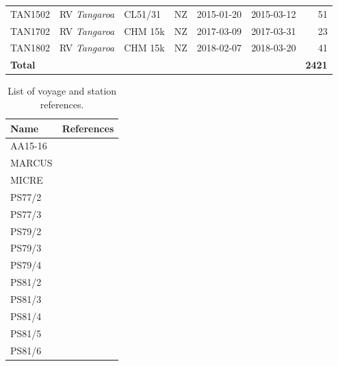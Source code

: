 \documentclass[12pt,a4paper]{article}
\begin{document}
\begin{table}
\begin{tabular}{llllllr}
TAN1502  & RV \emph{Tangaroa}            & CL51/31 & NZ       & 2015-01-20 & 2015-03-12 & 51 \\
TAN1702  & RV \emph{Tangaroa}            & CHM 15k & NZ       & 2017-03-09 & 2017-03-31 & 23 \\
TAN1802  & RV \emph{Tangaroa}            & CHM 15k & NZ       & 2018-02-07 & 2018-03-20 & 41 \\
\hline
\textbf{Total} &                         &         &          &            &            & \textbf{2421}\\
\end{tabular}
\normalsize
\end{table}

\begin{table}
\caption{List of voyage and station references.}
\label{tab:voyage-references}
\small
\begin{tabular}{lp{14.5cm}}
\textbf{Name} & \textbf{References}\\
\hline
AA15-16  & \cite{klekociuk2020} \\
MARCUS   & \cite{mcfarquhar2016,mcfarquhar2019,zhang2017,keeler2017,walton2017,cromwell2017,mcfarquhar2021} \\
MICRE    & \cite{marchand2015,marchand2020,zhang2016,mcfarquhar2021} \\
PS77/2   & \cite{kniglanglo2011a,kniglanglo2011b,kniglanglo2011c,kniglanglo2014a,fahrbach2011} \\
PS77/3   & \cite{kniglanglo2011d,kniglanglo2011e,kniglanglo2012a,kniglanglo2014b,knust2011} \\
PS79/2   & \cite{kniglanglo2012b,kniglanglo2012c,kniglanglo2012d,kniglanglo2014c,kattner2012} \\
PS79/3   & \cite{kniglanglo2012e,kniglanglo2012f,kniglanglo2012g,kniglanglo2014d,wolfgladrow2012} \\
PS79/4   & \cite{kniglanglo2012h,kniglanglo2012i,kniglanglo2012j,kniglanglo2014e,lucassen2012} \\
PS81/2   & \cite{kniglanglo2013a,kniglanglo2013b,kniglanglo2013c,kniglanglo2014f,boebel2013} \\
PS81/3   & \cite{kniglanglo2013d,kniglanglo2013e,kniglanglo2013f,kniglanglo2014g,gutt2013} \\
PS81/4   & \cite{kniglanglo2013g,kniglanglo2013h,kniglanglo2013i,kniglanglo2014f,bohrmann2013} \\
PS81/5   & \cite{kniglanglo2013j,kniglanglo2013k,kniglanglo2013l,kniglanglo2014g,jokat2013} \\
PS81/6   & \cite{kniglanglo2013m,kniglanglo2013n,kniglanglo2013o,kniglanglo2014h,lemke2013} \\

\end{tabular}
\end{table}
\end{document}
